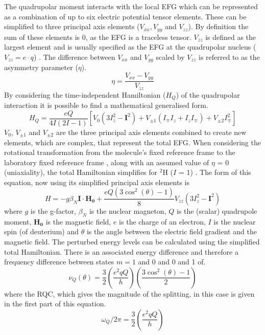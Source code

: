 The quadrupolar moment interacts with the local \ac{EFG} which can be represented as a combination of up to six electric potential tensor elements. These can be simplified to three principal axis elements ($V_{xx}, V_{yy}$ and $V_{zz}$). By definition the sum of these elements is 0, as the \ac{EFG} is a traceless tensor. $V_{zz}$ is defined as the largest element and is usually specified as the \ac{EFG} at the quadrupolar nucleus ($V_{zz} = e\cdot q$) \cite{Elliott2021WhatMedia}. The difference between $V_{xx}$ and $V_{yy}$ scaled by $V_{zz}$ is referred to as the asymmetry parameter ($\eta$).
\begin{equation}
    \eta = \frac{V_{xx}-V_{yy}}{V_{zz}}
\end{equation}
By considering the time-independent Hamiltonian ($H_Q$) of the quadrupolar interaction it is possible to find a mathematical generalised form.
\begin{equation}
    H_Q = \frac{eQ}{4I(2I-1)}[V_0(3I^2_z-\boldsymbol{I}^2) + V_{\pm1}(I_{\mp}I_z+I_zI_\mp)+V_{\pm2}I^2_\mp]
\end{equation}
$V_0$, $V_{\pm1}$ and $V_{\pm2}$ are the three principal axis elements combined to create new elements, which are complex, that represent the total \ac{EFG}. When considering the rotational transformation from the molecule's fixed reference frame to the laboratory fixed reference frame \cite{Seelig1977DeuteriumMembranes}, along with an assumed value of $\eta$ = 0 (uniaxiality), the total Hamiltonian simplifies for $^2$H ($I$ = 1)  \cite{Sharf1995DetectionNMR-Spectroscopy}. The form of this equation, now using its simplified principal axis elements is
\begin{equation}
    H = -g\beta_N\boldsymbol{I}\cdot\boldsymbol{H_0} + \frac{eQ(3\cos^2(\theta)-1)}{8}V_{zz}(3I_z^2-\boldsymbol{I}^2)
\end{equation}
where $g$ is the g-factor, $\beta_N$ is the nuclear magneton, $Q$ is the (scalar) quadrupole moment, $\boldsymbol{H_0}$ is the magnetic field, $e$ is the charge of an electron, $I$ is the nuclear spin (of deuterium) and $\theta$ is the angle between the electric field gradient and the magnetic field. The perturbed energy levels can be calculated using the simplified total Hamiltonian. There is an associated energy difference and therefore a frequency difference between states $m=1$ and 0 and 0 and 1 of.
\begin{equation}
    \nu_Q(\theta) = \frac{3}{2}\left(\frac{e^2qQ}{h}\right)\left(\frac{3\cos^2(\theta)-1}{2}\right)
    \label{eqn:Quad:Angle}
\end{equation}
where the \ac{RQC}, which gives the magnitude of the splitting, in this case is given in the first part of this equation.
\begin{equation}
    \omega_Q/2\pi = \frac{3}{2}\left(\frac{e^2qQ}{h}\right)
    \label{eqn:Quad:RQC}
\end{equation}

